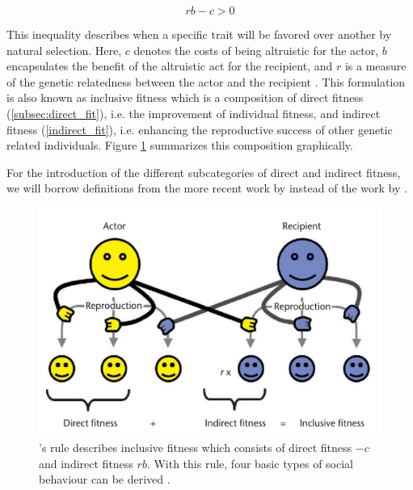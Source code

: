 \documentclass[sigconf]{acmart}
\begin{document}
    \begin{equation}
        rb-c>0\label{eq:rb-c}
    \end{equation}


    This inequality describes when a specific trait will be favored over another by natural selection.
    Here, $c$ denotes the costs of being altruistic for the actor, $b$ encapsulates the benefit of the altruistic act for the recipient, and $r$ is a measure of the genetic relatedness between the actor and the recipient \cite{west_altruism_2010}.
    This formulation is also known as inclusive fitness which is a composition of direct fitness (\ref{subsec:direct_fit}), i.e. the improvement of individual fitness, and indirect fitness (\ref{indirect_fit}), i.e. enhancing the reproductive success of other genetic related individuals.
    Figure \ref{fig:hamilton} summarizes this composition graphically.

    For the introduction of the different subcategories of direct and indirect fitness, we will borrow definitions from the more recent work by \citeauthor{west_altruism_2010} \cite{west_altruism_2010} instead of the work by \citeauthor{gardner_theory_2009} \cite{gardner_theory_2009}.

    \begin{figure}
        \includegraphics[width=\columnwidth]{figures/hamiltons_rule}
        \caption{\citeauthor{hamilton_kin_1964}'s rule describes inclusive fitness which consists of direct fitness $-c$ and indirect fitness $rb$. With this rule, four basic types of social behaviour can be derived \cite{gardner_theory_2009}.}
        \label{fig:hamilton}
    \end{figure}
\end{document}
